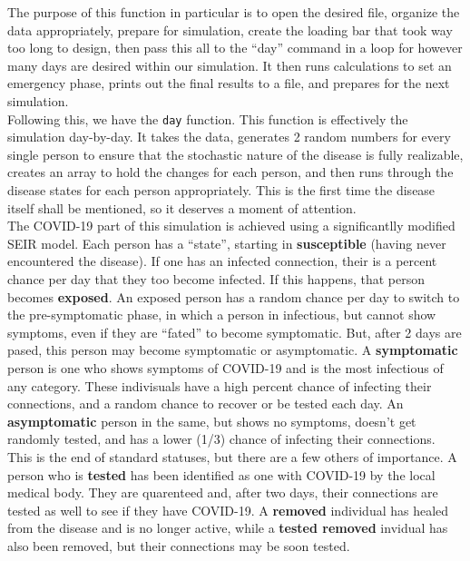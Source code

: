 \documentclass{article}
\numberwithin{equation}{section} %
\theoremstyle{definition}
\begin{document}
\begin{multicols*}{2}
The purpose of this function in particular is to open the desired file, organize the data appropriately, prepare for simulation, create the loading bar that took way too long to design, then pass this all to the ``day'' command in a loop for however many days are desired within our simulation. It then runs calculations to set an emergency phase, prints out the final results to a file, and prepares for the next simulation. \\

Following this, we have the \lstinline{day} function. This function is effectively the simulation day-by-day. It takes the data, generates 2 random numbers for every single person to ensure that the stochastic nature of the disease is fully realizable, creates an array to hold the changes for each person, and then runs through the disease states for each person appropriately. This is the first time the disease itself shall be mentioned, so it deserves a moment of attention. \\

The COVID-19 part of this simulation is achieved using a significantlly modified SEIR model. Each person has a ``state'', starting in \textbf{susceptible} (having never encountered the disease). If one has an infected connection, their is a percent chance per day that they too become infected. If this happens, that person becomes \textbf{exposed}. An exposed person has a random chance per day to switch to the pre-symptomatic phase, in which a person in infectious, but cannot show symptoms, even if they are ``fated'' to become symptomatic. But, after 2 days are pased, this person may become symptomatic or asymptomatic. A \textbf{symptomatic} person is one who shows symptoms of COVID-19 and is the most infectious of any category. These indivisuals have a high percent chance of infecting their connections, and a random chance to recover or be tested each day. An \textbf{asymptomatic} person in the same, but shows no symptoms, doesn't get randomly tested, and has a lower (1/3) chance of infecting their connections. \\

This is the end of standard statuses, but there are a few others of importance. A person who is \textbf{tested} has been identified as one with COVID-19 by the local medical body. They are quarenteed and, after two days, their connections are tested as well to see if they have COVID-19. A \textbf{removed} individual has healed from the disease and is no longer active, while a \textbf{tested removed} invidual has also been removed, but their connections may be soon tested. \\


\end{multicols*}
\end{document}
